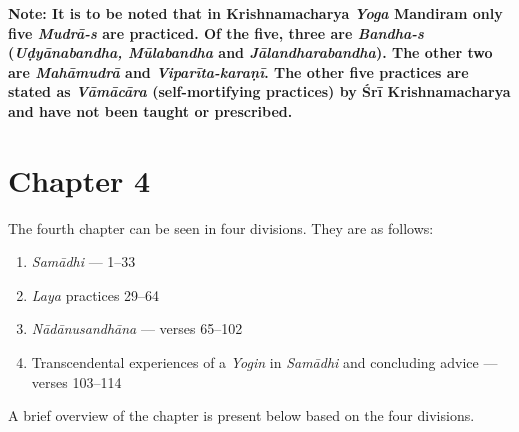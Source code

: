 \textbf{Note: It is to be noted that in Krishnamacharya \textit{Yoga} Mandiram only five \textit{Mudrā-s} are practiced. Of the five, three are \textit{Bandha-s} (\textit{Uḍyānabandha, Mūlabandha} and \textit{Jālandharabandha}). The other two are \textit{Mahāmudrā} and \textit{Viparīta-karaṇī}. The other five practices are stated as \textit{Vāmācāra} (self-mortifying practices) by Śrī Krishnamacharya and have not been taught or prescribed.}

\section*{Chapter 4}

The fourth chapter can be seen in four divisions. They are as follows:

\begin{enumerate}
\item \textit{Samādhi} --- 1--33
\item \textit{Laya} practices 29--64
\item \textit{Nādānusandhāna} --- verses 65--102
\item Transcendental experiences of a \textit{Yogin} in \textit{Samādhi} and concluding advice ---  verses 103--114
\end{enumerate}

A brief overview of the chapter is present below based on the four divisions.

